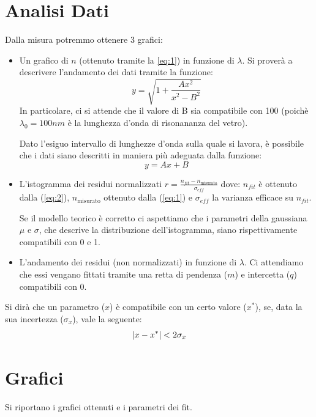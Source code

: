 \documentclass[10pt,twocolumn]{article}
\begin{document}
    \section{Analisi Dati}
    \noindent Dalla misura potremmo ottenere 3 grafici:
    \begin{itemize}
      \item Un grafico di $n$ (ottenuto tramite la \ref{eq:1}) in funzione di $\lambda$. Si proverà a descrivere l'andamento dei dati tramite la funzione:
      \begin{equation}
        y = \sqrt{1 + \frac{Ax^2}{x^2 - B^2}} 
      \label{eq:2}
      \end{equation}
      \noindent In particolare, ci si attende che il valore di B sia compatibile con 100 (poichè $\lambda_0 = 100nm$ è la lunghezza d'onda di risonananza del vetro).

      \noindent Dato l'esiguo intervallo di lunghezze d'onda sulla quale si lavora, è possibile che i dati siano descritti in maniera più adeguata dalla funzione:
      \begin{equation}
        y = Ax + B
        \label{eq:3}
      \end{equation}
      \item L'istogramma dei residui normalizzati $r = \frac{n_{fit} - n_{\text{misurato}}}{\sigma_{eff}}$ dove: $n_{fit}$ è ottenuto dalla (\ref{eq:2}), 
      $n_{\text{misurato}}$ ottenuto dalla (\ref{eq:1}) e $\sigma_{eff}$ la varianza efficace su $n_{fit}$.

      \noindent Se il modello teorico è corretto ci aspettiamo che i parametri della gaussiana $\mu$ e $\sigma$, che descrive la distribuzione dell'istogramma, siano rispettivamente compatibili con 0 e 1.

      \item L'andamento dei residui (non normalizzati) in funzione di $\lambda$. Ci attendiamo che essi vengano fittati tramite una retta di pendenza ($m$) e intercetta
      ($q$) compatibili con 0.
    \end{itemize}

  Si dirà che un parametro ($x$) è compatibile con un certo valore ($x^*$), se, data la sua incertezza ($\sigma_x$), vale la seguente:
  \[
  \abs{x - x^*} < 2\sigma_x
  \]

    \section{Grafici}
    \noindent Si riportano i grafici ottenuti e i parametri dei fit.
\end{document}

